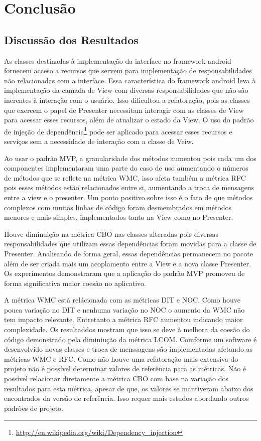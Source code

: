 \chapter{Conclusão}

\section{Discussão dos Resultados}
As classes destinadas à implementação da interface no framework android fornecem
acceso a recursos que servem para implementação de responsabilidades não
relacionadas com a interface. Essa característica do framework android leva à
implementação da camada de View com diversas responsabilidades que não são
inerentes à interação com o usuário. Isso dificultou a refatoração, pois as
classes que exercem o papel de Presenter necessitam interagir com as classes de
View para acessar esses recursos, além de atualizar o estado da View. O uso do
padrão de injeção de dependência\footnote{\url{http://en.wikipedia.org/wiki/Dependency_injection}}
pode ser aplicado para acessar esses recursos e serviços sem a necessidade de
interação com a classe de Veiw.

Ao usar o padrão MVP, a granularidade dos métodos aumentou pois cada um dos
componentes implementaram uma parte do caso de uso aumentando o números de
métodos que se reflete na métrica WMC, isso afeta também a métrica RFC pois
esses métodos estão relacionados entre si, aumentando a troca de mensagens entre
a view e o presenter. Um ponto positivo sobre isso é o fato de que métodos 
complexos com muitas linhas de código foram desmembrados em métodos menores e
mais simples, implementados tanto na View como no Presenter.

Houve diminuição na métrica CBO nas classes alteradas pois diversas
responsabilidades que utilizam essas dependências foram movidas para a classe de
Presenter. Analisando de forma geral, essas dependências permanecem no pacote
além de ser criada mais um acoplamento entre a View e a nova classe Presenter.
Os experimentos demonstraram que a aplicação do padrão MVP promoveu de forma
significativa maior coesão no aplicativo.

A métrica WMC está relácionada com as métricas DIT e NOC. Como houve pouca
variação no DIT e nenhuma variação no NOC o aumento da WMC não tem impacto
relevante. Entretanto a métrica RFC aumentou indicando maior complexidade. Os
resultaddos mostram que isso se deve à melhora da coesão do código demonstrado pela
diminiução da métrica LCOM. Comforme um software é desenvolvido novas classes e
troca de menssagens são implementadas afetando as métricas WMC e RFC. Como não
houve uma refatoração mais extensiva do projeto não é possível determinar
valores de referência para as métricas. Não é possível relacionar diretamente a
métrica CBO com base na variação dos resultados para esta métrica, apesar de
que, os valores se mantiveram abaixo dos encontrados da versão de referência.
Isso requer mais estudos abordando outros padrões de projeto. 


